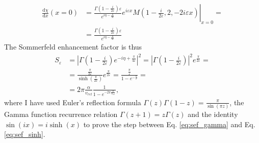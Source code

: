 \begin{align}
	\frac{\mathrm{d}\chi }{\mathrm{d}x} (x=0) &=
	\left.
		\frac{\Gamma \left( 1- \frac{i}{2\varepsilon } \right) \varepsilon }{e^{i \eta -\frac{\pi}{4\varepsilon }}} e^{i\varepsilon x} M\left(1-\frac{i}{2\varepsilon },2,-2 i \varepsilon x\right)
	\right\vert _{x=0}= \\
	&= \frac{\Gamma \left( 1- \frac{i}{2\varepsilon }\right) \varepsilon }{e^{i \eta - \frac{\pi}{4\varepsilon }}}
\end{align}
The Sommerfeld enhancement factor is thus
\begin{align}
	S_{\varepsilon } &= \left\vert \Gamma \left(1-\frac{i}{2\varepsilon }\right) e^{-i \eta + \frac{\pi}{4\varepsilon }} \right\vert ^2=\left\vert \Gamma \left(1-\frac{i}{2\varepsilon }\right)\right\vert ^2 e^{\frac{\pi}{2\varepsilon }}=\label{eq:sef_gamma}\\
	&= \frac{\frac{\pi}{2\varepsilon }}{\sinh \left( \frac{\pi }{2 \varepsilon } \right)}e^{\frac{\pi}{2\varepsilon }} = \frac{\frac{\pi}{\varepsilon }}{1- e^{-\frac{\pi}{\varepsilon }}}=\label{eq:sef_sinh}\\
	&= 2\pi \frac{\alpha}{v_{rel} } \frac{1}{1- e^{-2\pi \frac{\alpha}{v_{rel} }}}\label{eq:result},
\end{align}
where I have used Euler's reflection formula \(\Gamma (z) \Gamma (1-z) = \frac{\pi}{\sin(\pi z)}\), the Gamma function recurrence relation \(\Gamma (z+1)=z \Gamma (z)\) and the identity \(\sin (ix)=i \sinh (x)\) to prove the step between Eq. \eqref{eq:sef_gamma} and Eq. \eqref{eq:sef_sinh}.